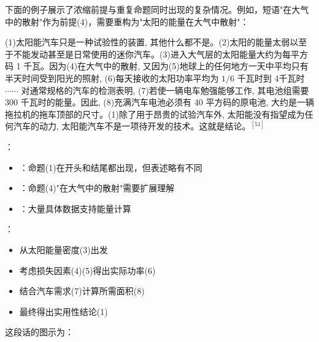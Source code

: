 下面的例子展示了浓缩前提与重复命题同时出现的复杂情况。例如，短语"在大气中的散射"作为前提(4)，需要重构为"太阳的能量在大气中散射"：

\begin{displayquote}
(1)太阳能汽车只是一种试验性的装置, 其他什么都不是。(2)太阳的能量太弱以至于不能发动甚至是日常使用的迷你汽车。(3)进入大气层的太阳能量大约为每平方码 1 千瓦。因为(4)在大气中的散射, 又因为(5)地球上的任何地方一天中平均只有半天时间受到阳光的照射, (6)每天接收的太阳功率平均为 $1 / 6$ 千瓦时到 4千瓦时 $\cdots \cdots$ 对通常规格的汽车的检测表明, (7)若使一辆电车勉强能够工作, 其电池组需要 300 千瓦时的能量。因此, (8)充满汽车电池必须有 40 平方码的原电池, 大约是一辆拖拉机的拖车顶部的尺寸。(1)除了用于昂贵的试验汽车外, 太阳能没有指望成为任何汽车的动力, 太阳能汽车不是一项待开发的技术。这就是结论。$^{[51]}$
\end{displayquote}

\begin{examplebox}[title=太阳能汽车论证的结构分析]
：
\begin{itemize}
  \item {}：命题(1)在开头和结尾都出现，但表述略有不同
  \item {}：命题(4)"在大气中的散射"需要扩展理解
  \item {}：大量具体数据支持能量计算
\end{itemize}

：
\begin{itemize}
  \item 从太阳能量密度(3)出发
  \item 考虑损失因素(4)(5)得出实际功率(6)
  \item 结合汽车需求(7)计算所需面积(8)
  \item 最终得出实用性结论(1)
\end{itemize}
\end{examplebox}

这段话的图示为：


